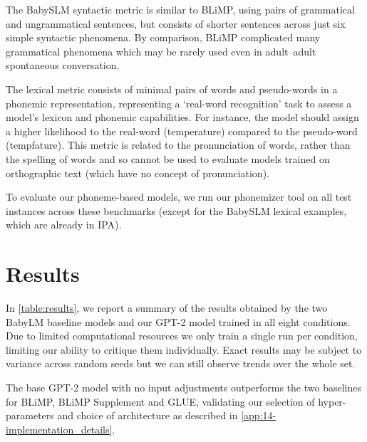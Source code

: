 The BabySLM syntactic metric is similar to BLiMP, using pairs of grammatical and ungrammatical sentences, but consists of shorter sentences across just six simple syntactic phenomena. By comparison, BLiMP complicated many grammatical phenomena which may be rarely used even in adult--adult spontaneous conversation. 

The lexical metric consists of minimal pairs of words and pseudo-words in a phonemic representation, representing a `real-word recognition' task to assess a model's lexicon and phonemic capabilities. For instance, the model should assign a higher likelihood to the real-word \texttt{} (temperature) compared to the pseudo-word \texttt{} (tempfature). This metric is related to the pronunciation of words, rather than the spelling of words and so cannot be used to evaluate models trained on orthographic text (which have no concept of pronunciation).%

To evaluate our phoneme-based models, we run our phonemizer tool on all test instances across these benchmarks (except for the BabySLM lexical examples, which are already in IPA). %

\section{Results}
\label{sec:14-results}

In \cref{table:results}, we report a summary of the results obtained by the two BabyLM baseline models and our \mbox{GPT-2} model trained in all eight conditions. Due to limited computational resources we only train a single run per condition, limiting our ability to critique them individually. Exact results may be subject to variance across random seeds but we can still observe trends over the whole set. 

The base \mbox{GPT-2} model with no input adjustments outperforms the two baselines for BLiMP, BLiMP Supplement and GLUE, validating our selection of hyper-parameters and choice of architecture as described in \cref{app:14-implementation_details}.

